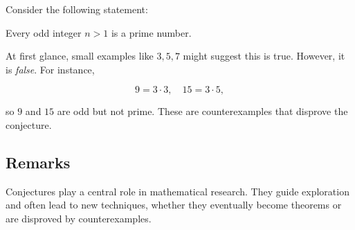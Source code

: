 \begin{example}
Consider the following statement:

\begin{conjecture}
Every odd integer \( n > 1 \) is a prime number.
\end{conjecture}

At first glance, small examples like \( 3, 5, 7 \) might suggest this is true.
However, it is \emph{false}. For instance,


\[
9 = 3 \cdot 3, \quad 15 = 3 \cdot 5,
\]


so \( 9 \) and \( 15 \) are odd but not prime. These are counterexamples that disprove
the conjecture.
\end{example}

\subsection{Remarks}

\begin{remark}
Conjectures play a central role in mathematical research. They guide exploration and
often lead to new techniques, whether they eventually become theorems or are disproved
by counterexamples.
\end{remark}
